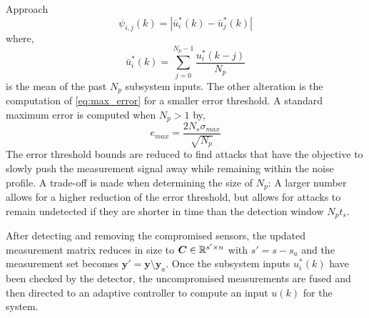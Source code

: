 \begin{section}{Approach}
\begin{equation}
        \label{eq:input_diff2}
        \psi_{i,j}(k)=|\bar{u}^*_i(k)-\bar{u}^*_j(k)|
    \end{equation}
where,
    \begin{equation}
        \label{eq:Average_input}
        \bar{u}^*_i(k) = \sum_{j=0}^{N_p-1} \frac{u^*_i(k-j)}{N_p}
    \end{equation}
is the mean of the past $N_p$ subsystem inputs. The other alteration is the computation of \eqref{eq:max_error} for a smaller error threshold. A standard maximum error is computed when $N_p>1$ by,
    \begin{equation}
	    \label{eq:max_error2}
	    e_{max} = \frac{2N_s\sigma_{max}}{\sqrt{N_p}}
	\end{equation}
The error threshold bounds are reduced to find attacks that have the objective to slowly push the measurement signal away while remaining within the noise profile. A trade-off is made when determining the size of $N_p$: A larger number allows for a higher reduction of the error threshold, but allows for attacks to remain undetected if they are shorter in time than the detection window $N_pt_s$. 

After detecting and removing the compromised sensors, the updated measurement matrix reduces in size to $\bm{C} \in \mathbb{R}^{s' \times n}$ with $s'=s-s_a$ and the measurement set becomes $\bm{y}' =\bm{y}\setminus\bm{y}_a$. Once the subsystem inputs $u_i^*(k)$ have been checked by the detector, the uncompromised measurements are fused and then directed to an adaptive controller to compute an input $u(k)$ for the system.


	


\end{section}
